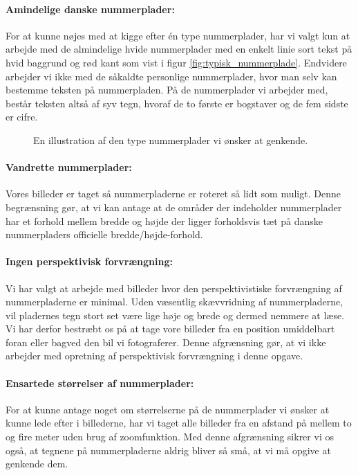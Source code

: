\paragraph{Amindelige danske nummerplader:}
For at kunne nøjes med at kigge efter én type nummerplader, har vi valgt kun at arbejde med de almindelige hvide nummerplader med en enkelt linie sort tekst på hvid baggrund og rød kant som vist i figur \vref{fig:typisk_nummerplade}. Endvidere arbejder vi ikke med de såkaldte personlige nummerplader, hvor man selv kan bestemme teksten på nummerpladen. På de nummerplader vi arbejder med, består teksten altså af syv tegn, hvoraf de to første er bogstaver og de fem sidste er cifre.

\begin{figure}[htp]
\centering
{} 
\caption{En illustration af den type nummerplader vi ønsker at genkende.}
\label{fig:typisk_nummerplade}
\end{figure}

\paragraph{Vandrette nummerplader:}
Vores billeder er taget så nummerpladerne er roteret så lidt som muligt. Denne begrænsning gør, at vi kan antage at de områder der indeholder nummerplader har et forhold mellem bredde og højde der ligger forholdsvis tæt på danske nummerpladers officielle bredde/højde-forhold.

\paragraph{Ingen perspektivisk forvrængning:}
Vi har valgt at arbejde med billeder hvor den perspektivistiske forvrængning af nummerpladerne er minimal. Uden væsentlig skævvridning af nummerpladerne, vil pladernes tegn stort set være lige høje og brede og dermed nemmere at læse. Vi har derfor bestræbt os på at tage vore billeder fra en position umiddelbart foran eller bagved den bil vi fotograferer. Denne afgrænsning gør, at vi ikke arbejder med opretning af perspektivisk forvrængning i denne opgave.

\paragraph{Ensartede størrelser af nummerplader:}
For at kunne antage noget om størrelserne på de nummerplader vi ønsker at kunne lede efter i billederne, har vi taget alle billeder fra en afstand på mellem to og fire meter uden brug af zoomfunktion. Med denne afgrænsning sikrer vi os også, at tegnene på nummerpladerne aldrig bliver så små, at vi må opgive at genkende dem.

